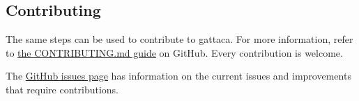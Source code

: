 \subsection{Contributing}

The same steps can be used to contribute to \gls{gattaca}. For more information, refer to \href{https://github.com/Feat-FeAR/GATTACA/blob/main/CONTRIBUTING.md}{the CONTRIBUTING.md guide} on GitHub. Every contribution is welcome.

The \href{https://github.com/Feat-FeAR/GATTACA/issues}{GitHub issues page} has information on the current issues and improvements that require contributions.
